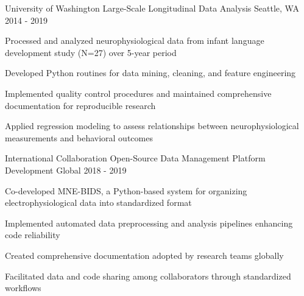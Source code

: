 \newpage
{}


\begin{cventries}
    \cventry
      {University of Washington} %
      {Large-Scale Longitudinal Data Analysis} %
      {Seattle, WA} %
      {2014 - 2019} %
      {
        \begin{cvitems} %
          \item {Processed and analyzed neurophysiological data from infant language development study (N=27) over 5-year period}
          \item {Developed Python routines for data mining, cleaning, and feature engineering}
          \item {Implemented quality control procedures and maintained comprehensive documentation for reproducible research}
          \item {Applied regression modeling to assess relationships between neurophysiological measurements and behavioral outcomes}
        \end{cvitems}
      }

    \cventry
      {International Collaboration} %
      {Open-Source Data Management Platform Development} %
      {Global} %
      {2018 - 2019} %
      {
        \begin{cvitems} %
          \item {Co-developed MNE-BIDS, a Python-based system for organizing electrophysiological data into standardized format}
          \item {Implemented automated data preprocessing and analysis pipelines enhancing code reliability}
          \item {Created comprehensive documentation adopted by research teams globally}
          \item {Facilitated data and code sharing among collaborators through standardized workflows}
        \end{cvitems}
      }


\end{cventries}
